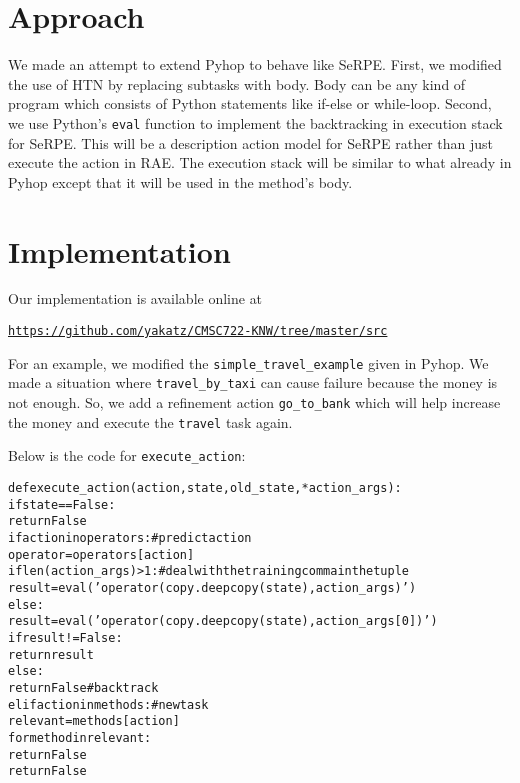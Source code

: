 \documentclass[11pt]{article} %
\begin{document}
\section{Approach}
We made an attempt to extend Pyhop to behave like SeRPE. 
First, we modified the use of HTN by replacing subtasks with 
body. Body can be any kind of program which consists of
 Python statements like if-else or while-loop.
Second, we use Python's \texttt{eval} function to implement the 
backtracking in execution stack for SeRPE. This will be a 
description action model for SeRPE rather than just execute
 the action in RAE. The execution stack will be similar to what
 already in Pyhop except that it will be used in the method's body.

\section{Implementation}

Our implementation is available online at
\begin{center}
\href{https://github.com/yakatz/CMSC722-KNW/tree/master/src}
{\tt https://github.com/yakatz/CMSC722-KNW/tree/master/src}
\end{center}

For an example, we modified the \texttt{simple\_travel\_example} given in Pyhop.
We made a situation where \texttt{travel\_by\_taxi} can cause failure because
the money is not enough. So, we add a refinement action \texttt{go\_to\_bank}
which will help increase the money and execute the \texttt{travel} task again.

Below is the code for \texttt{execute\_action}:

{\small
\begin{alltt}
def execute_action(action, state, old_state, *action_args):
    if state == False:
        return False
    if action in operators:  # predict action
        operator = operators[action]       
        if len(action_args) > 1: # deal with the training comma in the tuple
            result = eval('operator(copy.deepcopy(state),action_args)')
        else:
            result = eval('operator(copy.deepcopy(state),action_args[0])')
        if result != False:
            return result
        else:
            return False  # backtrack
    elif action in methods: # new task
        relevant = methods[action]
        for method in relevant:
        return False
    return False
\end{alltt}}
\end{document}
